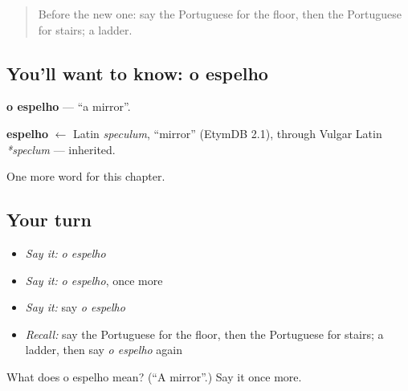 \label{lesson:PT-C50-espelho}



\begin{quote}
Before the new one: say the Portuguese for the floor, then the Portuguese for stairs; a ladder.
\end{quote}

\subsection*{You'll want to know: o espelho}
\textbf{o espelho} — \textquotedblleft{}a mirror\textquotedblright{}.

\begin{cousinweb}
\textbf{espelho} $\leftarrow$ Latin \emph{speculum}, \textquotedblleft{}mirror\textquotedblright{} (EtymDB 2.1), through Vulgar Latin \emph{*speclum} — inherited.
\end{cousinweb}

\begin{grammarlens}[title={What you've built}]
One more word for this chapter.
\end{grammarlens}

\subsection*{Your turn}
\begin{itemize}
\raggedright
  \item \emph{Say it:} \emph{o espelho}
  \item \emph{Say it:} \emph{o espelho}, once more
  \item \emph{Say it:} say \emph{o espelho}
  \item \emph{Recall:} say the Portuguese for the floor, then the Portuguese for stairs; a ladder, then say \emph{o espelho} again
\end{itemize}

\begin{tcolorbox}[breakable,colback=teal!4,colframe=teal!35!black,title={Before you move on}]
What does o espelho mean? (\textquotedblleft{}A mirror\textquotedblright{}.) Say it once more.
\end{tcolorbox}
